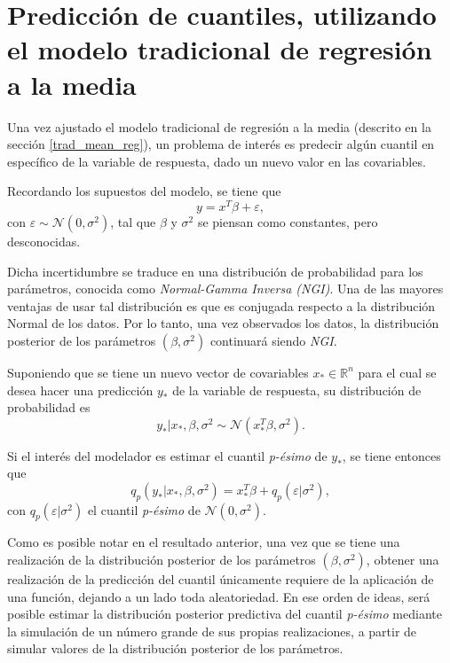 \chapter{Predicci\'on de cuantiles, utilizando el modelo tradicional de regresi\'on a la media} \label{trad_mean_alg}

Una vez ajustado el modelo tradicional de regresi\'on a la media (descrito en la secci\'on \ref{trad_mean_reg}), un problema de inter\'es es predecir alg\'un cuantil en espec\'ifico de la variable de respuesta, dado un nuevo valor en las covariables.

Recordando los supuestos del modelo, se tiene que
\begin{equation*}
    y = x^T\beta + \varepsilon,
\end{equation*}
con $\varepsilon \sim \mathcal{N}(0,\sigma^2)$, tal que $\beta$ y $\sigma^2$ se piensan como constantes, pero desconocidas. 

Dicha incertidumbre se traduce en una distribuci\'on de probabilidad para los par\'ametros, conocida como \textit{Normal-Gamma Inversa (NGI)}. Una de las mayores ventajas de usar tal distribuci\'on es que es conjugada respecto a la distribuci\'on Normal de los datos. Por lo tanto, una vez observados los datos, la distribuci\'on posterior de los par\'ametros $(\beta, \sigma^2)$ continuar\'a siendo \textit{NGI}.

Suponiendo que se tiene un nuevo vector de covariables $x_* \in \mathbb{R}^n$ para el cual se desea hacer una predicci\'on $y_*$ de la variable de respuesta, su distribuci\'on de probabilidad es
\begin{equation*}
    y_* | x_*, \beta, \sigma^2 \sim \mathcal{N}(x_*^T\beta, \sigma^2).
\end{equation*}

Si el inter\'es del modelador es estimar el cuantil \textit{p-\'esimo} de $y_*$, se tiene entonces que
\begin{equation*}
    q_p(y_*|x_*, \beta, \sigma^2) = x_*^T\beta + q_p(\varepsilon|\sigma^2),
\end{equation*}
con $q_p(\varepsilon|\sigma^2)$ el cuantil \textit{p-\'esimo} de $\mathcal{N}(0,\sigma^2)$.

Como es posible notar en el resultado anterior, una vez que se tiene una realizaci\'on de la distribuci\'on posterior de los par\'ametros $(\beta, \sigma^2)$, obtener una realizaci\'on de la predicci\'on del cuantil \'unicamente requiere de la aplicaci\'on de una funci\'on, dejando a un lado toda aleatoriedad. En ese orden de ideas, ser\'a posible estimar la distribuci\'on posterior predictiva del cuantil \textit{p-\'esimo} mediante la simulaci\'on de un n\'umero grande de sus propias realizaciones, a partir de simular valores de la distribuci\'on posterior de los par\'ametros. 

